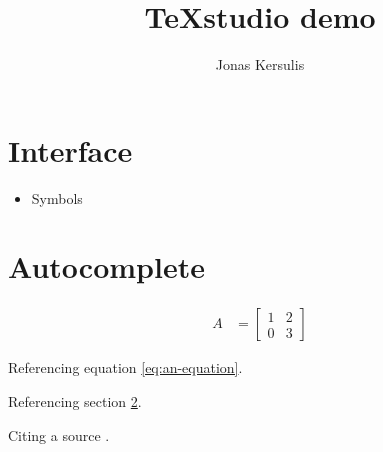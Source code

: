 \documentclass[10pt,letterpaper]{article}
\author{Jonas Kersulis}
\title{TeXstudio demo}
\begin{document}
\section{Interface}\label{sec:interface}
\begin{itemize}
	\item Symbols
\end{itemize} 

\section{Autocomplete}\label{sec:autocomplete}

\begin{align}
\label{eq:an-equation} A &= \begin{bmatrix}
1 & 2 \\
0 & 3
\end{bmatrix}
\end{align}

Referencing equation \ref{eq:an-equation}.

Referencing section \ref{sec:autocomplete}.

Citing a source \cite{chertkov2011a}.
\end{document}
